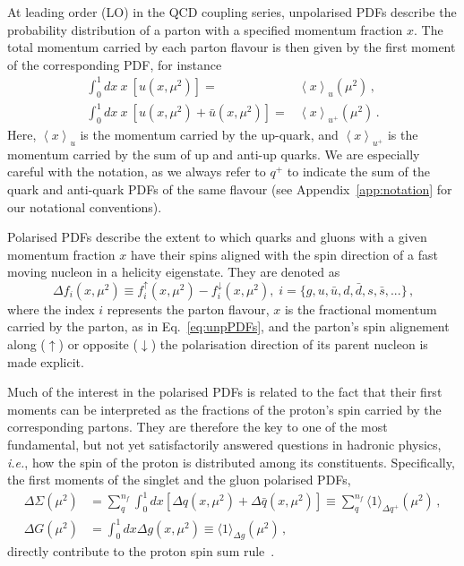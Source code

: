 At leading order (LO) in the QCD coupling series, unpolarised PDFs 
describe the probability distribution of a parton with a specified 
momentum fraction $x$.
%
The total momentum carried by each parton flavour is then given by 
the first moment of the corresponding PDF, for instance
%
\begin{align}
\int_{0}^{1}dx\ x\ \left[u(x,\mu^2)\right] 
= & {}  
\left\langle x\right\rangle _{u}(\mu^2)\,, \label{eq:umoment1}\\
\int_{0}^{1}dx\ x\ \left[u(x,\mu^2)+\bar{u}(x,\mu^2)\right] 
= & {} 
\left\langle x\right\rangle _{u^{+}}(\mu^2)\,. \label{eq:uplusmoment1}
\end{align}
%
Here, $\left\langle x\right\rangle _{u}$ is the momentum
carried by the up-quark, and $\left\langle x\right\rangle _{u^{+}}$ is
the momentum carried by the sum of up and anti-up quarks.
%
We are especially careful with the notation, as we always refer to $q^+$ to 
indicate the sum of the quark and anti-quark PDFs of the same flavour (see
Appendix~\ref{app:notation} for our notational conventions).

Polarised PDFs describe the extent to which quarks and gluons 
with a given momentum fraction $x$ have their spins aligned with the spin 
direction of a fast moving nucleon in a helicity eigenstate. 
%
They are denoted as 
\begin{equation}
\Delta f_i(x,\mu^2) \equiv f_i^{\uparrow}(x,\mu^2) - f_i^{\downarrow}(x,\mu^2)
\mbox{,} \ \ i=\{g,u,\bar{u},d,\bar{d},s,\bar{s},...\}
\,\mbox{,}
\label{eq:polPDFs}
\end{equation}
where the index $i$ represents the parton flavour, $x$ is the fractional 
momentum carried by the parton, as in Eq.~\eqref{eq:unpPDFs},  
and the parton's spin alignement along ($\uparrow$) or opposite 
($\downarrow$) the polarisation direction of its parent nucleon
is made explicit.

Much of the interest in the polarised PDFs is related to the fact that 
their first moments can be interpreted as the fractions of the proton's 
spin carried by the corresponding partons.
%
They are therefore the key to one of the most fundamental, 
but not yet satisfactorily answered questions in hadronic physics,
{\it i.e.}, how the spin of the proton is distributed among its constituents.
%
Specifically, the first moments of the singlet and the gluon polarised PDFs,
\begin{align}
\Delta\Sigma(\mu^2)
& =
\sum_{q}^{n_f}\int_0^1 dx 
\left[\Delta q(x, \mu^2) + \Delta\bar{q}(x, \mu^2)\right]
\equiv
\sum_q^{n_f}\langle 1 \rangle_{\Delta q^+}(\mu^2)\,,
\\
\Delta G(\mu^2)
& =
\int_0^1 dx \Delta g(x,\mu^2)
\equiv
\langle 1 \rangle_{\Delta g}(\mu^2)
\,,
\label{eq:moments}
\end{align}
directly contribute to the proton spin sum rule~\cite{Leader:2013jra}.

